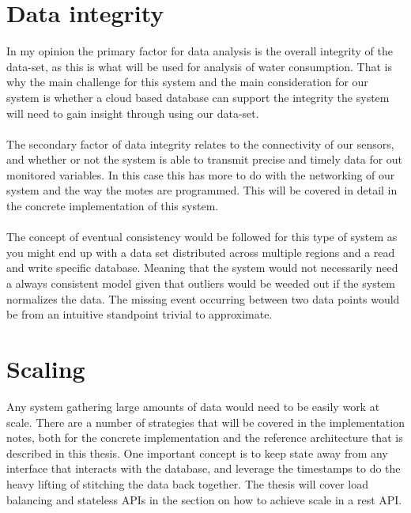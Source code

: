 \documentclass[]{uiophd}
\begin{document}
\section{Data integrity}
In my opinion the primary factor for data analysis is the overall integrity of the data-set, as this is what will be used for analysis of water consumption. That is why the main challenge for this system and the main consideration for our system is whether a cloud based database can support the integrity the system will need to gain insight through using our data-set. 
\\\\
The secondary factor of data integrity relates to the connectivity of our sensors, and whether or not the system is able to transmit precise and timely data for out monitored variables. In this case this has  more to do with the networking of our system and the way the motes are programmed. This will be covered in detail in the concrete implementation of this system.
\\\\
The concept of eventual consistency would be followed for this type of system as you might end up with a data set distributed across multiple regions and a read and write specific database. Meaning that the system would not necessarily need a always consistent model given that outliers would be weeded out if the system normalizes the data. The missing event occurring between two data points would be from an intuitive standpoint trivial to approximate.
\section{Scaling}
Any system gathering large amounts of data would need to be easily work at scale. There are a number of strategies that will be covered in the implementation notes, both for the concrete implementation and the reference architecture that is described in this thesis. One important concept is to keep state away from any interface that interacts with the database, and leverage the timestamps to do the heavy lifting of stitching the data back together. The thesis will cover load balancing and stateless APIs in the section on how to achieve scale in a rest API.
\end{document}
